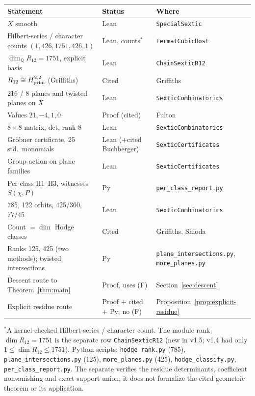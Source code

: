 \documentclass[11pt]{amsart}
\theoremstyle{remark}\newtheorem{remark}[theorem]{Remark}
\newcommand{\Q}{\mathbb{Q}}\newcommand{\PP}{\mathbb{P}}
\begin{document}
\begin{center}\small
\begin{tabular}{lll}
\hline
Statement & Status & Where\\\hline
$X$ smooth & Lean & \texttt{SpecialSextic}\\
Hilbert-series / character counts $(1,426,1751,426,1)$ & Lean, counts$^*$ & \texttt{FermatCubicHost}\\
$\dim_{\Q}R_{12}=1751$, explicit basis & Lean & \texttt{ChainSexticR12}\\
$R_{12}\cong H^{2,2}_{\rm prim}$ (Griffiths) & Cited & Griffiths\\
216 / 8 planes and twisted planes on $X$ & Lean & \texttt{SexticCombinatorics}\\
Values $21,-4,1,0$ & Proof (cited) & Fulton\\
$8\times8$ matrix, det, rank 8 & Lean & \texttt{SexticCombinatorics}\\
Gr\"obner certificate, 25 std.\ monomials & Lean (+cited Buchberger) & \texttt{SexticCertificates}\\
Group action on plane families & Lean & \texttt{SexticCertificates}\\
Per-class H1--H3, witnesses $S(\chi,P)$ & Py & \texttt{per\_class\_report.py}\\
785, 122 orbits, 425/360, 77/45 & Lean & \texttt{SexticCombinatorics}\\
Count $=\dim$ Hodge classes & Cited & Griffiths, Shioda\\
Ranks 125, 425 (two methods); twisted intersections & Py & \texttt{plane\_intersections.py}, \texttt{more\_planes.py}\\
Descent route to Theorem~\ref{thm:main} & Proof, uses (F) & Section~\ref{sec:descent}\\
Explicit residue route & Proof + cited + Py; no (F) & Proposition~\ref{prop:explicit-residue}\\\hline
\end{tabular}\end{center}
{\small $^*$A kernel-checked Hilbert-series / character count. The module rank $\dim R_{12}=1751$ is the separate row \texttt{ChainSexticR12} (new in v1.5; v1.4 had only $1\le\dim R_{12}\le1751$).}
\medskip
Python scripts: \texttt{hodge\_rank.py} (785), \texttt{plane\_intersections.py} (125),
\texttt{more\_planes.py} (425), \texttt{hodge\_classify.py}, \texttt{per\_class\_report.py}.
The separate  verifies the
residue determinants, coefficient nonvanishing and exact support union; it does
not formalize the cited geometric theorem or its application.
\end{document}
